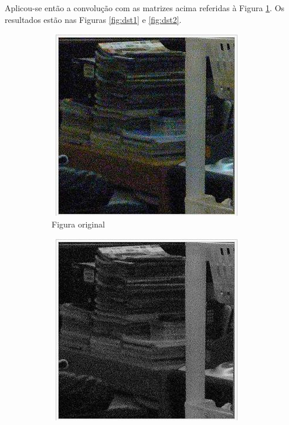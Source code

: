 \documentclass[10pt,a4paper]{article}
\begin{document}
Aplicou-se então a convolução com as matrizes acima referidas à Figura \ref{fig:original}. Os resultados estão nas Figuras \ref{fig:dst1} e \ref{fig:dst2}.
\begin{figure}[!ht]
    \centering
    \begin{subfigure}[ht]{0.45\textwidth}
        \includegraphics[width=\textwidth]{original.jpg}
        \caption{Figura original\cite{image}}
        \label{fig:original}
    \end{subfigure}
    \qquad
    \begin{subfigure}[ht]{0.45\textwidth}
        \includegraphics[width=\textwidth]{src.jpg}

\end{subfigure}
\end{figure}
\end{document}

